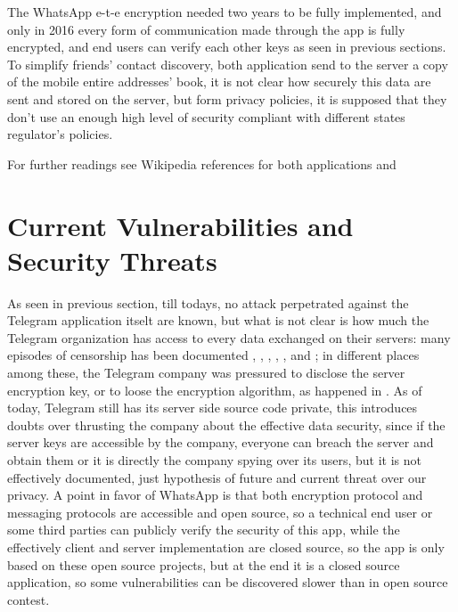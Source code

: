 \documentclass{article}
\begin{document}
The WhatsApp e-t-e encryption needed two years to be fully implemented, and only in 2016 every form of communication made through the app is fully encrypted, and end users can verify each other keys as seen in previous sections.\newline
To simplify friends' contact discovery, both application send to the server a copy of the mobile entire addresses' book, it is not clear how securely this data are sent and stored on the server, but form privacy policies, it is supposed that they don't use an enough high level of security compliant with different states regulator's policies.\newline 


For further readings see Wikipedia references for both applications \cite{tel_wiki} and \cite{what_wiki}


\section{Current Vulnerabilities and Security Threats}

As seen in previous section, till todays, no attack perpetrated against the Telegram application itselt are known, but what is not clear is how much the Telegram organization has access to every data exchanged on their servers: many episodes of censorship has been documented \cite{china_cen}, \cite{honk_cen}, \cite{bahrain_cen}, \cite{pakistan_cen}, \cite{india_cen}, \cite{russia_cen} and \cite{iran_cen}; in different places among these, the Telegram company was pressured to disclose the server encryption key, or to loose the encryption algorithm, as happened in \cite{usa_weak}.\newline
As of today, Telegram still has its server side source code private, this introduces doubts over thrusting the company about the effective data security, since if the server keys are accessible by the company, everyone can breach the server and obtain them or it is directly the company spying over its users, but it is not effectively documented, just hypothesis of future and current threat over our privacy.\newline
A point in favor of WhatsApp is that both encryption protocol and messaging protocols are accessible and open source, so a technical end user or some third parties can publicly verify the security of this app, while the effectively client and server implementation are closed source, so the app is only based on these open source projects, but at the end it is a closed source application, so some vulnerabilities can be discovered slower than in open source contest.\newline
\end{document}
